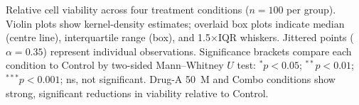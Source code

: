 \caption{Relative cell viability across four treatment conditions ($n=100$ per group).
Violin plots show kernel-density estimates; overlaid box plots indicate median (centre line),
interquartile range (box), and 1.5$\times$IQR whiskers. Jittered points ($\alpha=0.35$)
represent individual observations. Significance brackets compare each condition to Control
by two-sided Mann--Whitney $U$ test: $^{*}p<0.05$; $^{**}p<0.01$; $^{***}p<0.001$; ns,
not significant. Drug-A 50~\textmu M and Combo conditions show strong, significant reductions
in viability relative to Control.}
